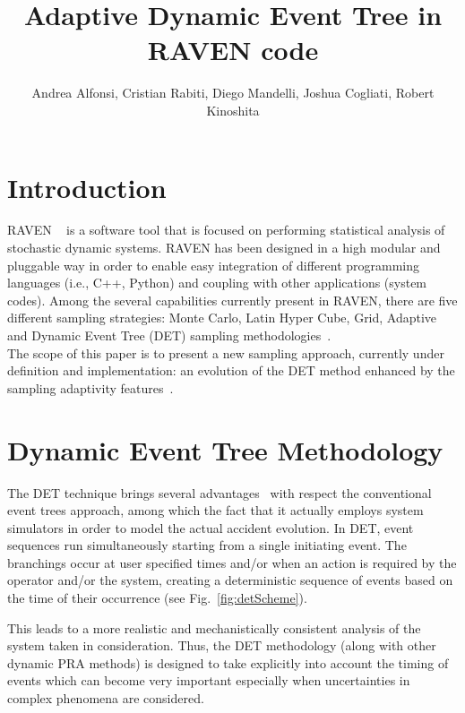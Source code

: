 \documentclass{anstrans}
\title{Adaptive Dynamic Event Tree in RAVEN code}
\author{Andrea Alfonsi, Cristian Rabiti, Diego Mandelli, Joshua Cogliati, Robert Kinoshita}
\institute{Idaho National Laboratory, 2525 Fremont Avenue, Idaho Falls, ID 83402, United States}
\begin{document}
\section{Introduction}

RAVEN ~\cite{ravenFY12,alfonsiMC,alfonsiESREL2014} is a software tool that is focused on performing statistical analysis of stochastic dynamic systems. RAVEN has been designed in a high modular and pluggable way in order to enable easy integration of different programming languages (i.e., C++, Python) and coupling with other applications (system codes). Among the several capabilities currently present in RAVEN, there are five different sampling strategies: Monte Carlo, Latin Hyper Cube, Grid, Adaptive and Dynamic Event Tree (DET) sampling methodologies~\cite{ravenFY14}. \\ The scope of this paper is to present a new sampling approach, currently under definition and implementation: an evolution of the DET method enhanced by the  sampling adaptivity features~\cite{mandelliSVMANS}. 


\section{Dynamic Event Tree Methodology}
The DET technique brings several advantages~\cite{alfonsiPSA2013,ADAPTHakobyan} with respect the conventional event trees approach, among which the fact that it actually employs system simulators in order to model the actual accident evolution. In DET,  event sequences run simultaneously starting from a single initiating event. The branchings occur at user specified times and/or when an action is required by the operator and/or the system, creating a deterministic sequence of events based on the time of their occurrence (see Fig.~\ref{fig:detScheme}). 

This leads to a more realistic and mechanistically consistent analysis of the system taken in consideration. Thus, the DET methodology (along with other dynamic PRA methods) is designed to take explicitly into account the timing of events which can become very important especially when uncertainties in complex phenomena are considered. 
\end{document}
